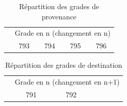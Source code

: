 \documentclass[11pt,a4paper]{article}
\begin{document}
\begin{table}[h!]
\centering
\caption{Répartition des grades de provenance} 
\label{entry}
\begin{tabular}{lcccc}
\toprule
 & \multicolumn{4}{c}{Grade en n (changement en n)} \\
 & 793 & 794 & 795 & 796 \\ 
  \hline
  
   \hline
\bottomrule
\end{tabular}
\end{table}

\medskip


\begin{table}[h!]
\centering
\caption{Répartition des grades de destination} 
\label{exit}
\begin{tabular}{lcccc}
\toprule
 & \multicolumn{4}{c}{Grade en n (changement en n+1)} \\
 & 791 & 792 &  &  \\ 
  \hline
  
   \hline
\bottomrule
\end{tabular}
\end{table}
\medskip
\end{document}
